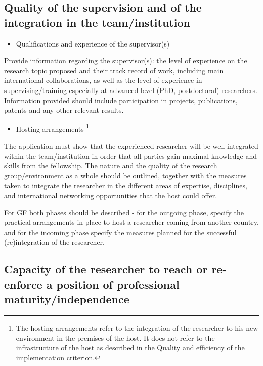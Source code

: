 \subsection{Quality of the supervision and of the integration in the team/institution}
\label{sec:excellence_supervision}

\begin{itemize}
	\item Qualifications and experience of the supervisor(s)
\end{itemize}

\noindent
Provide information regarding the supervisor(s): the level of experience on the research topic proposed and their track record of work, including main international collaborations, as well as the level of experience in supervising/training especially at advanced level (PhD, postdoctoral) researchers. Information provided should include participation in projects, publications, patents and any other relevant results.

\begin{itemize}
	\item Hosting arrangements%
	\footnote{The hosting arrangements refer to the integration of the researcher to his new environment in the premises of the host. It does not refer to the infrastructure of the host as described in the Quality and efficiency of the implementation criterion.}
\end{itemize}

\noindent
The application must show that the experienced researcher will be well integrated within the team/institution in order that all parties gain maximal knowledge and skills from the fellowship. The nature and the quality of the research group/environment as a whole should be outlined, together with the measures taken to integrate the researcher in the different areas of expertise, disciplines, and international networking opportunities that the host could offer. 

\noindent
For GF both phases should be described - for the outgoing phase, specify the practical arrangements in place to host a researcher coming from another country, and for the incoming phase specify the measures planned for the successful (re)integration of the researcher. 




\subsection{Capacity of the researcher to reach or re-enforce a position of professional ma\-tu\-ri\-ty/\-in\-de\-pen\-den\-ce}
\label{sec:excellence_maturity}

